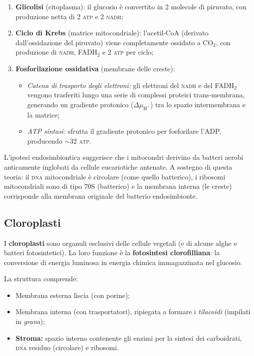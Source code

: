 \documentclass[11pt,a4paper,openright,twoside]{book}
\theoremstyle{definition}
\theoremstyle{plain}
\theoremstyle{remark}
\newcommand{\dna}{\textsc{dna}}
\newcommand{\atp}{\textsc{atp}}
\newcommand{\nadh}{\textsc{nadh}}
\newcommand{\CO}{\ensuremath{\text{CO}_2}}
\begin{document}
\begin{enumerate}
  \item \textbf{Glicolisi} (citoplasma): il glucosio è convertito in 2 molecole di piruvato, con produzione netta di 2 \atp{} e 2 \nadh;

  \item \textbf{Ciclo di Krebs} (matrice mitocondriale): l'acetil-CoA (derivato dall'ossidazione del piruvato) viene completamente ossidato a \CO, con produzione di \nadh, FADH$_2$ e 2 \atp{} per ciclo;

  \item \textbf{Fosforilazione ossidativa} (membrane delle creste):
    \begin{itemize}
      \item \textit{Catena di trasporto degli elettroni:} gli elettroni del \nadh{} e del FADH$_2$ vengono trasferiti lungo una serie di complessi proteici trans-membrana, generando un gradiente protonico ($\Delta\mu_{\text{H}^+}$) tra lo spazio intermembrana e la matrice;
      \item \textit{ATP sintasi:} sfrutta il gradiente protonico per fosforilare l'ADP, producendo $\sim$32 \atp.
    \end{itemize}
\end{enumerate}

\begin{tcolorbox}[notebox, title={Origine endosimbiontica dei mitocondri}]
  L'ipotesi endosimbiontica suggerisce che i mitocondri derivino da batteri aerobi anticamente inglobati da cellule eucariotiche antenate. A sostegno di questa teoria: il \dna{} mitocondriale è circolare (come quello batterico), i ribosomi mitocondriali sono di tipo 70S (batterico) e la membrana interna (le creste) corrisponde alla membrana originale del batterio endosimbionte.
\end{tcolorbox}

\subsection{Cloroplasti}

I \textbf{cloroplasti} sono organuli esclusivi delle cellule vegetali (e di alcune alghe e batteri fotosintetici). La loro funzione è la \textbf{fotosintesi clorofilliana}: la conversione di energia luminosa in energia chimica immagazzinata nel glucosio.

La struttura comprende:
\begin{itemize}
  \item Membrana esterna liscia (con porine);
  \item Membrana interna (con trasportatori), ripiegata a formare i \textit{tilacoidi} (impilati in \textit{grana});
  \item \textbf{Stroma:} spazio interno contenente gli enzimi per la sintesi dei carboidrati, \dna{} residuo (circolare) e ribosomi.
\end{itemize}
\end{document}
